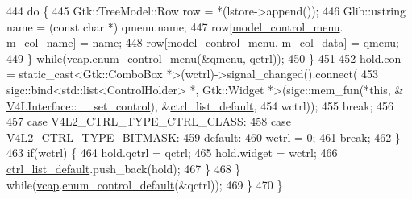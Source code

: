 \begin{DoxyCode}
444                             \textcolor{keywordflow}{do} \{
445                                 Gtk::TreeModel::Row row = *(lstore->append());
446                                 Glib::ustring name = (\textcolor{keyword}{const} \textcolor{keywordtype}{char} *) qmenu.name;
447                                 row[\hyperlink{class_v_s_s_s___g_u_i_1_1_v4_l_interface_ac98e20c4b2875e7137f867b3da753640}{model\_control\_menu}.
      \hyperlink{class_v_s_s_s___g_u_i_1_1_v4_l_interface_1_1_model_column_a96d5f652d19a139a1380d9ffc0110ed0}{m\_col\_name}] = name;
448                                 row[\hyperlink{class_v_s_s_s___g_u_i_1_1_v4_l_interface_ac98e20c4b2875e7137f867b3da753640}{model\_control\_menu}.
      \hyperlink{class_v_s_s_s___g_u_i_1_1_v4_l_interface_1_1_model_column_aa6720e1b3e47adb85d36c3ec3a2bb262}{m\_col\_data}] = qmenu;
449                             \} \textcolor{keywordflow}{while}(\hyperlink{class_v_s_s_s___g_u_i_1_1_v4_l_interface_a7ece61f4ccc6d5321c445e60f34e7f33}{vcap}.\hyperlink{classv4lcap_a9d192d856a6f4243a4a4508beef2e211}{enum\_control\_menu}(&qmenu, qctrl));
450                         \}
451 
452                         hold.con = \textcolor{keyword}{static\_cast<}Gtk::ComboBox *\textcolor{keyword}{>}(wctrl)->signal\_changed().connect(
453                         sigc::bind<std::list<ControlHolder> *, Gtk::Widget *>(sigc::mem\_fun(*\textcolor{keyword}{this}, &
      \hyperlink{class_v_s_s_s___g_u_i_1_1_v4_l_interface_ad6eddc5cedbaf1b0e87b330aae937b46}{V4LInterface::\_\_set\_control}), &\hyperlink{class_v_s_s_s___g_u_i_1_1_v4_l_interface_a97faf21f7b67c8ef15ceeafa377c6ea4}{ctrl\_list\_default},
454                         wctrl));
455                         \textcolor{keywordflow}{break};
456 
457                     \textcolor{keywordflow}{case} V4L2\_CTRL\_TYPE\_CTRL\_CLASS:
458                     \textcolor{keywordflow}{case} V4L2\_CTRL\_TYPE\_BITMASK:
459                     \textcolor{keywordflow}{default}:
460                         wctrl = 0;
461                         \textcolor{keywordflow}{break};
462                 \}
463                 \textcolor{keywordflow}{if}(wctrl) \{
464                     hold.qctrl = qctrl;
465                     hold.widget = wctrl;
466                     \hyperlink{class_v_s_s_s___g_u_i_1_1_v4_l_interface_a97faf21f7b67c8ef15ceeafa377c6ea4}{ctrl\_list\_default}.push\_back(hold);
467                 \}
468             \} \textcolor{keywordflow}{while}(\hyperlink{class_v_s_s_s___g_u_i_1_1_v4_l_interface_a7ece61f4ccc6d5321c445e60f34e7f33}{vcap}.\hyperlink{classv4lcap_a34897884f1bfc348eea63d49d09417f7}{enum\_control\_default}(&qctrl));
469         \}
470     \}
\end{DoxyCode}

